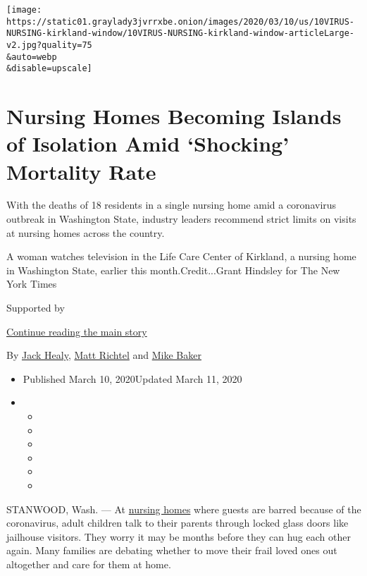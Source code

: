 \texttt{[image: https://static01.graylady3jvrrxbe.onion/images/2020/03/10/us/10VIRUS-NURSING-kirkland-window/10VIRUS-NURSING-kirkland-window-articleLarge-v2.jpg?quality=75\\\&auto=webp\\\&disable=upscale]}

\hypertarget{nursing-homes-becoming-islands-of-isolation-amid-shocking-mortality-rate}{%
\section{Nursing Homes Becoming Islands of Isolation Amid `Shocking'
Mortality
Rate}\label{nursing-homes-becoming-islands-of-isolation-amid-shocking-mortality-rate}}

With the deaths of 18 residents in a single nursing home amid a
coronavirus outbreak in Washington State, industry leaders recommend
strict limits on visits at nursing homes across the country.

A woman watches television in the Life Care Center of Kirkland, a
nursing home in Washington State, earlier this month.Credit...Grant
Hindsley for The New York Times

Supported by

\protect\hyperlink{after-sponsor}{Continue reading the main story}

By \href{https://www.nytimes3xbfgragh.onion/by/jack-healy}{Jack Healy},
\href{https://www.nytimes3xbfgragh.onion/by/matt-richtel}{Matt Richtel}
and \href{https://www.nytimes3xbfgragh.onion/by/mike-baker}{Mike Baker}

\begin{itemize}
\item
  Published March 10, 2020Updated March 11, 2020
\item
  \begin{itemize}
  \item
  \item
  \item
  \item
  \item
  \item
  \end{itemize}
\end{itemize}

STANWOOD, Wash. --- At
\href{https://www.nytimes3xbfgragh.onion/2020/04/17/nyregion/new-york-nursing-homes-coronavirus-deaths.html}{nursing
homes} where guests are barred because of the coronavirus, adult
children talk to their parents through locked glass doors like jailhouse
visitors. They worry it may be months before they can hug each other
again. Many families are debating whether to move their frail loved ones
out altogether and care for them at home.

